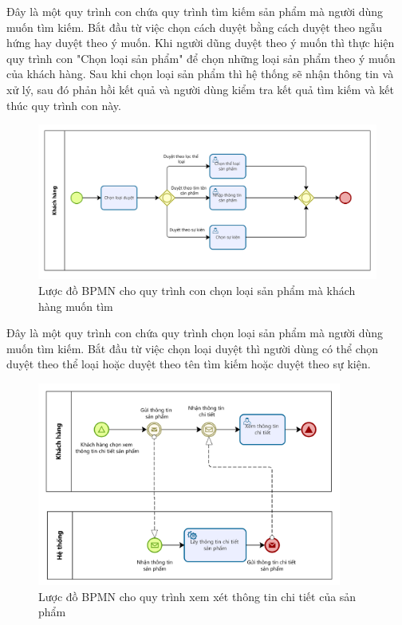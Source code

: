Đây là một quy trình con chứa quy trình tìm kiếm sản phẩm mà người dùng muốn tìm kiếm. Bắt đầu từ việc chọn cách duyệt bằng cách duyệt theo ngẫu hứng hay duyệt theo ý muốn. Khi người dũng duyệt theo ý muốn thì thực hiện quy trình con "Chọn loại sản phẩm" để chọn những loại sản phẩm theo ý muốn của khách hàng. Sau khi chọn loại sản phẩm thì hệ thống sẽ nhận thông tin và xử lý, sau đó phản hồi kết quả và người dùng kiểm tra kết quả tìm kiếm và kết thúc quy trình con này.
 
\begin{figure}[!htp]
    \centering
    \includegraphics[width=12cm]{img/BPMN/customer_buy/customer_select_type.png}
    \newline
    \caption{Lược đồ BPMN cho quy trình con chọn loại sản phẩm mà khách hàng muốn tìm}
\end{figure}
 
Đây là một quy trình con chứa quy trình chọn loại sản phẩm mà người dùng muốn tìm kiếm. Bắt đầu từ việc chọn loại duyệt thì người dùng có thể chọn duyệt theo thể loại hoặc duyệt theo tên tìm kiếm hoặc duyệt theo sự kiện.
 
\newpage
 
\begin{figure}[!htp]
    \centering
    \includegraphics[width=10cm]{img/BPMN/customer_buy/customer_product_detail.png}
    \newline
    \caption{Lược đồ BPMN cho quy trình xem xét thông tin chi tiết của sản phẩm}
\end{figure}
 

